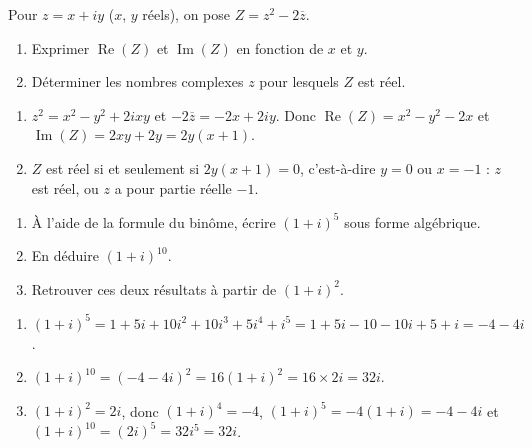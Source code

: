 \begin{exercise}
Pour $z=x+iy$ ($x$, $y$ réels), on pose $Z=z^2-2\overline z$.
\begin{enumerate}
\item Exprimer $\operatorname{Re}(Z)$ et $\operatorname{Im}(Z)$ en fonction de $x$ et $y$.
\item Déterminer les nombres complexes $z$ pour lesquels $Z$ est réel.
\end{enumerate}
\end{exercise}
\begin{solution}
\begin{enumerate}
\item $z^2=x^2-y^2+2ixy$ et $-2\overline z=-2x+2iy$. Donc $\operatorname{Re}(Z)=x^2-y^2-2x$ et $\operatorname{Im}(Z)=2xy+2y=2y(x+1)$.
\item $Z$ est réel si et seulement si $2y(x+1)=0$, c'est-à-dire $y=0$ ou $x=-1$ : $z$ est réel, ou $z$ a pour partie réelle $-1$.
\end{enumerate}
\end{solution}

\begin{exercise}
\begin{enumerate}
\item À l'aide de la formule du binôme, écrire $(1+i)^5$ sous forme algébrique.
\item En déduire $(1+i)^{10}$.
\item Retrouver ces deux résultats à partir de $(1+i)^2$.
\end{enumerate}
\end{exercise}
\begin{solution}
\begin{enumerate}
\item $(1+i)^5=1+5i+10i^2+10i^3+5i^4+i^5=1+5i-10-10i+5+i=-4-4i$.
\item $(1+i)^{10}=(-4-4i)^2=16(1+i)^2=16\times2i=32i$.
\item $(1+i)^2=2i$, donc $(1+i)^4=-4$, $(1+i)^5=-4(1+i)=-4-4i$ et $(1+i)^{10}=(2i)^5=32i^5=32i$.
\end{enumerate}
\end{solution}


